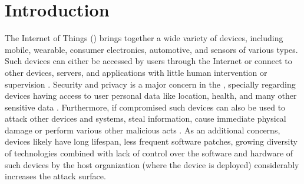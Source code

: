

\section{Introduction}



The Internet of Things (\iot) brings together a wide variety of devices,
including mobile, wearable, consumer electronics, automotive, and sensors of
various types.
% 
Such devices can either be accessed by users through the Internet or connect
to other devices, servers, and applications
with little human intervention or supervision
\cite{Tahsien2020,abane2019,haddadpajouh2019survey,Shanbhag2015}.
% 
Security and privacy is a major concern in the \iot, specially regarding
devices having access to user personal data like
location, health, and many other sensitive data \cite{sengupta2020comprehensive}.
% 
Furthermore, if compromised such devices can also be used to attack other
devices and systems, steal information, cause immediate physical damage or
perform various other malicious acts \cite{Kolias2017mirai}.
% 
As an additional concerns, \iot devices likely have long lifespan, less frequent
software patches, growing diversity of technologies combined with lack of
control over the software and hardware of such devices by the host organization
(where the device is deployed) considerably increases the attack surface.



